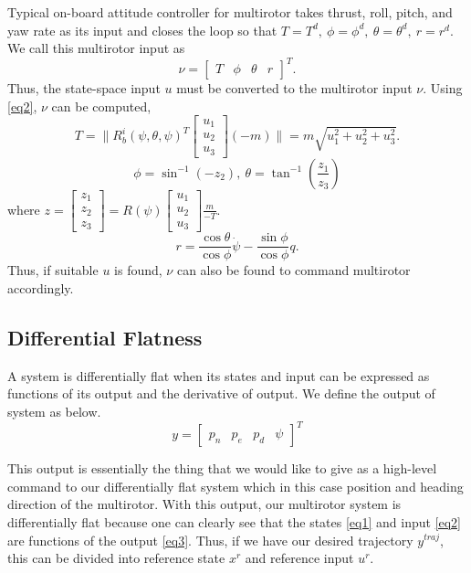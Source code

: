 \documentclass{article}
\begin{document}
Typical on-board attitude controller for multirotor takes thrust, roll, pitch, and yaw rate as its input and closes the loop so that $T=T^d,\ \phi=\phi^d,\ \theta=\theta^d, \ r=r^d$. We call this multirotor input as 
\[\nu=\begin{bmatrix}
T &  \phi & \theta & r
\end{bmatrix}^T.\]
Thus, the state-space input $u$ must be converted to the multirotor input $\nu$. Using \eqref{eq2}, $\nu$ can be computed, 
\[T=\|R_b^i(\psi,\theta,\psi)^T\begin{bmatrix}
u_1\\u_2\\u_3
\end{bmatrix}(-m) \|=m\sqrt{u_1^2+u_2^2+u_3^2}.\]
\[\phi=\sin^{-1}(-z_2), \ \theta=\tan^{-1}\left(\frac{z_1}{z_3}\right)\]
where $z=\begin{bmatrix}
z_1 \\ z_2 \\ z_3
\end{bmatrix} = R(\psi)\begin{bmatrix}
u_1 \\ u_2 \\ u_3
\end{bmatrix}\frac{m}{-T}$.
\[r=\frac{\cos\theta}{\cos\phi}\dot{\psi}-\frac{\sin\phi}{\cos\phi}q.\]
Thus, if suitable $u$ is found, $\nu$ can also be found to command multirotor accordingly.

\subsection*{Differential Flatness}
A system is differentially flat when its states and input can be expressed as functions of its output and the derivative of output. We define the output of system as below.
\[y=\begin{bmatrix}
p_n &  p_e & p_d & \psi
\end{bmatrix}^T \tag{3} \label{eq3} \]

This output is essentially the thing that we would like to give as a high-level command to our differentially flat system which in this case position and heading direction of the multirotor. With this output, our multirotor system is differentially flat because one can clearly see that the states \eqref{eq1} and input \eqref{eq2} are functions of the output \eqref{eq3}. Thus, if we have our desired trajectory $y^{traj}$, this can be divided into reference state $x^r$ and reference input $u^r$. 
\end{document}
